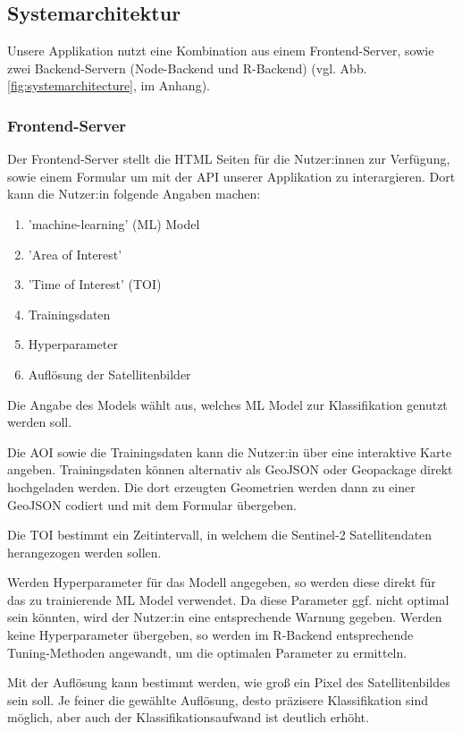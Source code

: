 \documentclass[a4paper,12pt]{article}
\begin{document}
\subsection{Systemarchitektur} \label{chpt:systemarchitecture}
Unsere Applikation nutzt eine Kombination aus einem Frontend-Server, sowie zwei Backend-Servern (Node-Backend und R-Backend) (vgl. Abb. \ref{fig:systemarchitecture}, im Anhang).

\subsubsection{Frontend-Server}
Der Frontend-Server stellt die HTML Seiten für die Nutzer:innen zur Verfügung, sowie einem Formular um mit der API unserer Applikation zu interargieren. Dort kann die Nutzer:in folgende Angaben machen:
\begin{multicols}{2}
\begin{enumerate}
    \item 'machine-learning' (ML) Model
    \item 'Area of Interest' 
    \item 'Time of Interest' (TOI)
    \item Trainingsdaten
    \item Hyperparameter
    \item Auflösung der Satellitenbilder
\end{enumerate}
\end{multicols}

Die Angabe des Models wählt aus, welches ML Model zur Klassifikation genutzt werden soll.
\par

Die AOI sowie die Trainingsdaten kann die Nutzer:in über eine interaktive Karte angeben. Trainingsdaten können alternativ als GeoJSON oder Geopackage direkt hochgeladen werden. Die dort erzeugten Geometrien werden dann zu einer GeoJSON codiert und mit dem Formular übergeben. 
\par
Die TOI bestimmt ein Zeitintervall, in welchem die Sentinel-2 Satellitendaten herangezogen werden sollen.
\par
Werden Hyperparameter für das Modell angegeben, so werden diese direkt für das zu trainierende ML Model verwendet. Da diese Parameter ggf. nicht optimal sein könnten, wird der Nutzer:in eine entsprechende Warnung gegeben. Werden keine Hyperparameter übergeben, so werden im R-Backend entsprechende Tuning-Methoden angewandt, um die optimalen Parameter zu ermitteln.
\par
Mit der Auflösung kann bestimmt werden, wie groß ein Pixel des Satellitenbildes sein soll. Je feiner die gewählte Auflösung, desto präzisere Klassifikation sind möglich, aber auch der Klassifikationsaufwand ist deutlich erhöht.
\end{document}
